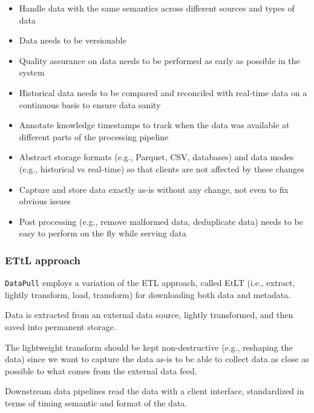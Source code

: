 \documentclass[11pt, reqno]{amsart}
\theoremstyle{definition}
\theoremstyle{remark}
\begin{document}
  \begin{itemize}
    \item Handle data with the same semantics across different sources and types
      of data

    \item Data needs to be versionable

    \item Quality assurance on data needs to be performed as early as possible in
      the system

    \item Historical data needs to be compared and reconciled with real-time data
      on a continuous basis to ensure data sanity

    \item Annotate knowledge timestamps to track when the data was available at different
      parts of the processing pipeline

    \item Abstract storage formats (e.g., Parquet, CSV, databases) and data modes
      (e.g., historical vs real-time) so that clients are not affected by these changes

    \item Capture and store data exactly as-is without any change, not even to
      fix obvious issues

    \item Post processing (e.g., remove malformed data, deduplicate data) needs
      to be easy to perform on the fly while serving data
  \end{itemize}

  \subsubsection{ETtL approach}
  \verb|DataPull| employs a variation of the ETL approach, called EtLT (i.e., extract,
  lightly transform, load, transform) for downloading both data and metadata.

  Data is extracted from an external data source, lightly transformed, and then saved
  into permanent storage.

  The lightweight transform should be kept non-destructive (e.g., reshaping the
  data) since we want to capture the data as-is to be able to collect data as close
  as possible to what comes from the external data feed.

  Downstream data pipelines read the data with a client interface, standardized
  in terms of timing semantic and format of the data.
\end{document}
